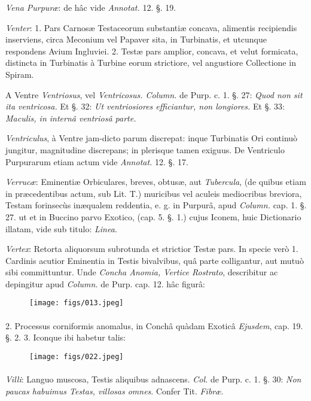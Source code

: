 \documentclass[a4paper, 11pt, oneside, polutonikogreek, german]{article}
\begin{document}
\emph{Vena Purpuræ}: de hâc vide \emph{Annotat.} 12. §. 19.

\emph{Venter}: 1. Pars Carnosæ Testaceorum substantiæ concava, alimentis recipiendis inserviens, circa Meconium vel Papaver sita, in Turbinatis, et utcunque respondens Avium Ingluviei. 2. Testæ pars amplior, concava, et velut formicata, distincta in Turbinatis à Turbine eorum strictiore, vel angustiore Collectione in Spiram.

A Ventre \emph{Ventriosus}, vel \emph{Ventricosus. Column.} de Purp. c. 1. §. 27: \emph{Quod non sit ita ventricosa.} Et §. 32: \emph{Ut ventriosiores efficiantur, non longiores.} Et §. 33: \emph{Maculis, in internâ ventriosâ parte.}

\emph{Ventriculus}, à Ventre jam-dicto parum discrepat: inque Turbinatis Ori continuò jungitur, magnitudine discrepans; in plerisque tamen exiguus. De Ventriculo Purpurarum etiam actum vide \emph{Annotat.} 12. §. 17.

\emph{Verrucæ}: Eminentiæ Orbiculares, breves, obtusæ, aut \emph{Tubercula}, (de quibus etiam in præcedentibus actum, sub Lit. T.) muricibus vel aculeis mediocribus breviora, Testam forinsecùs inæqualem reddentia, e. g. in Purpurâ, apud \emph{Column.} cap. 1. §. 27. ut et in Buccino parvo Exotico, (cap. 5. §. 1.) cujus Iconem, huic Dictionario illatam, vide sub titulo: \emph{Linea}.

\emph{Vertex}: Retorta aliquorsum subrotunda et strictior Testæ pars. In specie verò 1. Cardinis acutior Eminentia in Testis bivalvibus, quâ parte colligantur, aut mutuò sibi committuntur. Unde \emph{Concha Anomia, Vertice Rostrato}, describitur ac depingitur apud \emph{Column.} de Purp. cap. 12. hâc figurâ:

\begin{figure}[H]
\centering
\texttt{[image: figs/013.jpeg]}
\end{figure}
\paragraph{}
2. Processus corniformis anomalus, in Conchâ quàdam Exoticâ \emph{Ejusdem}, cap. 19. §. 2. 3. Iconque ibi habetur talis:

\begin{figure}[H]
\centering
\texttt{[image: figs/022.jpeg]}
\end{figure}
\paragraph{}
\emph{Villi}: Languo muscosa, Testis aliquibus adnascens. \emph{Col.} de Purp. c. 1. §. 30: \emph{Non paucas habuimus Testas, villosas omnes}. Confer Tit. \emph{Fibræ}.
\end{document}

